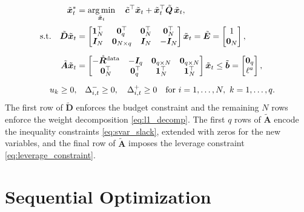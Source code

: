 \begin{equation} \label{eq:svar_reg_qp}
\begin{aligned}
    \tilde{\bm{x}}_t^* &= \operatorname*{arg\,min}_{\tilde{\bm{x}}_t} \quad
    \tilde{\bm{c}}^\top \tilde{\bm{x}}_t + \tilde{\bm{x}}_t^\top \tilde{\bm{Q}}\, \tilde{\bm{x}}_t, \\[2pt]
    \text{s.t.} \quad
     \tilde{\bm{D}} \tilde{\bm{x}}_t &=
    \begin{bmatrix} \bm{1}_N^\top & \bm{0}_q^\top & \bm{0}_N^\top & \bm{0}_N^\top \\
    \bm{I}_N & \bm{0}_{N \times q} & \bm{I}_N & -\bm{I}_N \end{bmatrix} \tilde{\bm{x}}_t
    = \tilde{\bm{E}} = \begin{bmatrix} 1 \\ \bm{0}_N \end{bmatrix}, \\[6pt]
     \tilde{\bm{A}} \tilde{\bm{x}}_t &=
    \begin{bmatrix} -\mathring{\bm{R}}^{\text{data}} & -\bm{I}_q & \bm{0}_{q \times N} & \bm{0}_{q \times N} \\
    \bm{0}_N^\top & \bm{0}_q^\top & \bm{1}_N^\top & \bm{1}_N^\top \end{bmatrix} \tilde{\bm{x}}_t
    \le \tilde{\bm{b}} = \begin{bmatrix} \bm{0}_q \\ \ell^a \end{bmatrix}, \\[6pt]
     u_k \ge 0, & \quad \Delta_{i,t}^- \ge 0,\quad \Delta_{i,t}^+ \ge 0
    \quad \text{for } i = 1, \dots, N,\ k = 1, \dots, q.
\end{aligned}
\end{equation}
The first row of $\tilde{\bm{D}}$ enforces the budget constraint and the remaining $N$ rows enforce the weight
decomposition \eqref{eq:l1_decomp}. The first $q$ rows of $\tilde{\bm{A}}$ encode the inequality constraints
\eqref{eq:svar_slack}, extended with zeros for the new variables, and the final row of $\tilde{\bm{A}}$ imposes the
leverage constraint \eqref{eq:leverage_constraint}.

\section{Sequential Optimization} \label{app:mv_separate}

